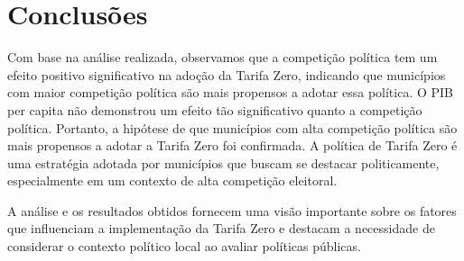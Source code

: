 \documentclass[
]{article}
\begin{document}
\section{Conclusões}\label{conclusuxf5es}

Com base na análise realizada, observamos que a competição política tem
um efeito positivo significativo na adoção da Tarifa Zero, indicando que
municípios com maior competição política são mais propensos a adotar
essa política. O PIB per capita não demonstrou um efeito tão
significativo quanto a competição política. Portanto, a hipótese de que
municípios com alta competição política são mais propensos a adotar a
Tarifa Zero foi confirmada. A política de Tarifa Zero é uma estratégia
adotada por municípios que buscam se destacar politicamente,
especialmente em um contexto de alta competição eleitoral.

A análise e os resultados obtidos fornecem uma visão importante sobre os
fatores que influenciam a implementação da Tarifa Zero e destacam a
necessidade de considerar o contexto político local ao avaliar políticas
públicas.
\end{document}
